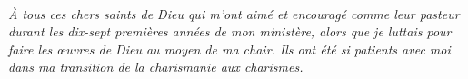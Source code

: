 \newpage
\mbox{}
\vfill
\parbox{4in}{
\begin{center}
\HRule \\[0.4cm]
\emph{À tous ces chers saints de Dieu qui m'ont aimé et encouragé comme leur
 pasteur durant les dix-sept premières années de mon ministère, alors que je
 luttais pour faire les œuvres de Dieu au moyen de ma chair. Ils ont été
 si patients avec moi dans ma transition de la \emph{charismanie}
 aux \emph{charismes}.}
\HRule \\[1.5cm]
\end{center}
}
\vfill
\mbox{}
\newpage

